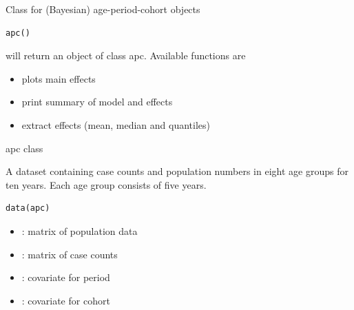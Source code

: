 \documentclass[a4paper]{book}
\begin{document}
%
\begin{Description}
Class for (Bayesian) age-period-cohort objects
\end{Description}
%
\begin{Usage}
\begin{verbatim}
apc()
\end{verbatim}
\end{Usage}
%
\begin{Details}
 will return an object of class apc. Available functions are
\begin{itemize}

\item{}  plots main effects
\item{}  print summary of model and effects 
\item{}  extract effects (mean, median and quantiles)
\end{itemize}

\end{Details}
%
\begin{Value}
apc class
\end{Value}
%
\begin{Description}
A dataset containing case counts and population numbers in eight age groups for ten years. Each age group consists of five years.
\end{Description}
%
\begin{Usage}
\begin{verbatim}
data(apc)
\end{verbatim}
\end{Usage}
%
\begin{Format}
\begin{itemize}

\item{} : matrix of population data
\item{} : matrix of case counts
\item{} : covariate for period
\item{} : covariate for cohort
\end{itemize}

\end{Format}
\end{document}
